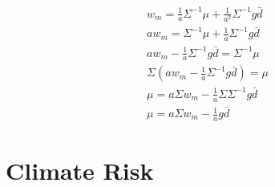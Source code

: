 \begin{equation}
    \begin{aligned}
    w_m = \frac{1}{a} \Sigma^{-1} \mu + \frac{1}{a^2} \Sigma^{-1} g \bar{d} \\
    a w_m = \Sigma^{-1} \mu + \frac{1}{a} \Sigma^{-1} g \bar{d} \\
    a w_m - \frac{1}{a} \Sigma^{-1} g \bar{d} = \Sigma^{-1} \mu \\
    \Sigma (a w_m - \frac{1}{a} \Sigma^{-1} g \bar{d}) = \mu \\ 
    \mu = a \Sigma w_m - \frac{1}{a} \Sigma \Sigma^{-1} g \bar{d} \\
    \mu = a \Sigma w_m - \frac{1}{a} g \bar{d}
    \end{aligned}
\end{equation}


\section{Climate Risk}